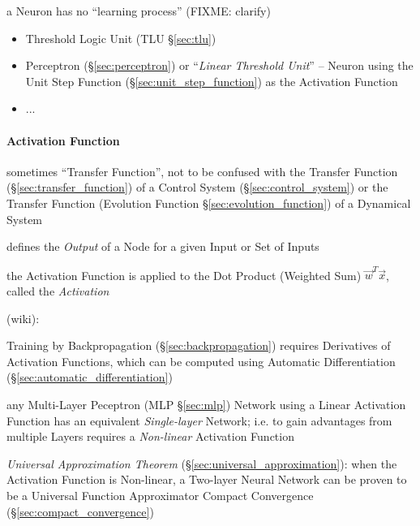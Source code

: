 a Neuron has no ``learning process'' (FIXME: clarify)

\begin{itemize}
  \item Threshold Logic Unit (TLU \S\ref{sec:tlu})
  \item Perceptron (\S\ref{sec:perceptron}) or ``\emph{Linear Threshold Unit}''
    -- Neuron using the Unit Step Function (\S\ref{sec:unit_step_function}) as
    the Activation Function
  \item ...
\end{itemize}



\paragraph{Activation Function}\label{sec:activation_function}\hfill

sometimes ``Transfer Function'', not to be confused with the Transfer Function
(\S\ref{sec:transfer_function}) of a Control System (\S\ref{sec:control_system})
or the Transfer Function (Evolution Function \S\ref{sec:evolution_function}) of
a Dynamical System

defines the \emph{Output} of a Node for a given Input or Set of Inputs

the Activation Function is applied to the Dot Product (Weighted Sum)
$\vec{w}^T \vec{x}$, called the \emph{Activation}

(wiki):

Training by Backpropagation (\S\ref{sec:backpropagation}) requires Derivatives
of Activation Functions, which can be computed using Automatic Differentiation
(\S\ref{sec:automatic_differentiation})

any Multi-Layer Peceptron (MLP \S\ref{sec:mlp}) Network using a Linear
Activation Function has an equivalent \emph{Single-layer} Network; i.e. to gain
advantages from multiple Layers requires a \emph{Non-linear} Activation Function

\emph{Universal Approximation Theorem} (\S\ref{sec:universal_approximation}):
when the Activation Function is Non-linear, a Two-layer Neural Network can be
proven to be a Universal Function Approximator \fist Compact Convergence
(\S\ref{sec:compact_convergence})

